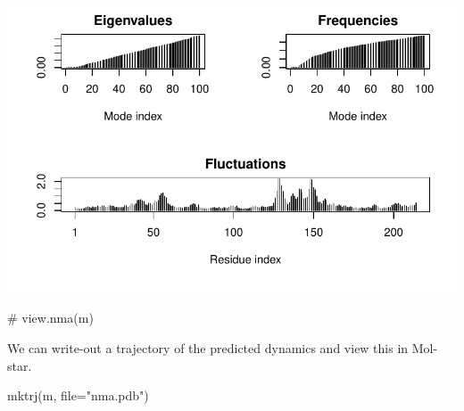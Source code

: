 \documentclass[
  letterpaper,
  DIV=11,
  numbers=noendperiod]{scrartcl}
\newenvironment{Shaded}{\begin{snugshade}}{\end{snugshade}}
\newcommand{\AttributeTok}[1]{\textcolor[rgb]{0.40,0.45,0.13}{#1}}
\newcommand{\CommentTok}[1]{\textcolor[rgb]{0.37,0.37,0.37}{#1}}
\newcommand{\FunctionTok}[1]{\textcolor[rgb]{0.28,0.35,0.67}{#1}}
\newcommand{\NormalTok}[1]{\textcolor[rgb]{0.00,0.23,0.31}{#1}}
\newcommand{\StringTok}[1]{\textcolor[rgb]{0.13,0.47,0.30}{#1}}
\begin{document}
\includegraphics{Class10Structural_files/figure-pdf/unnamed-chunk-16-1.pdf}

\begin{Shaded}
\begin{Highlighting}[]
 \CommentTok{\# view.nma(m)}
\end{Highlighting}
\end{Shaded}

We can write-out a trajectory of the predicted dynamics and view this in
Mol-star.

\begin{Shaded}
\begin{Highlighting}[]
\FunctionTok{mktrj}\NormalTok{(m, }\AttributeTok{file=}\StringTok{"nma.pdb"}\NormalTok{)}
\end{Highlighting}
\end{Shaded}
\end{document}
